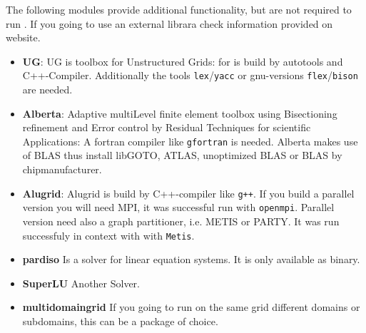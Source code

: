 The following modules provide additional functionality, but are not required to run \Dumux.
If you going to use an external librara check information provided on \Dune website.

\begin{itemize}
\item \textbf{UG}: UG is toolbox for Unstructured Grids: for \Dumux is build by autotools and C++-Compiler. Additionally the tools \texttt{lex}/\texttt{yacc} or gnu-versions \texttt{flex}/\texttt{bison} are needed. 

\item \textbf{Alberta}: Adaptive multiLevel finite element toolbox using Bisectioning refinement and Error control by Residual Techniques for scientific Applications: A fortran compiler like \texttt{gfortran} is needed.  Alberta makes use of BLAS thus install libGOTO, ATLAS, unoptimized BLAS or BLAS by chipmanufacturer.\\

\item \textbf{Alugrid}: Alugrid is build by C++-compiler like \texttt{g++}. If you build a parallel version you will need MPI, it was successful run with \texttt{openmpi}. Parallel version need also a graph partitioner, i.e. METIS or PARTY. It was run successfuly in context with \Dune with \texttt{Metis}.


\item \textbf{pardiso} Is a solver for linear equation systems. It is only available as binary.

\item \textbf{SuperLU} Another Solver.

\item \textbf{\Dune multidomaingrid} If you going to run on the same grid different domains or subdomains, this can be a package of choice.
\end{itemize}


